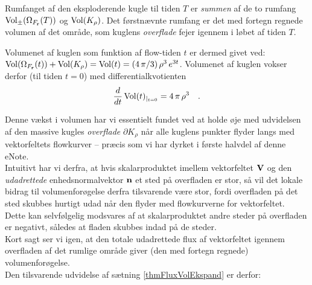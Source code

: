 \begin{aha}
Rumfanget af den eksploderende kugle til tiden $T$ er \emph{summen} af de to rumfang $\operatorname{Vol}_{\pm}(\Omega_{F_{\mathbf{r}}}(T))$ og $\operatorname{Vol}(K_{\rho})$. Det førstnævnte rumfang er det med fortegn regnede volumen af det område, som kuglens \emph{overflade} fejer igennem i løbet af tiden $T$.
\end{aha}

Volumenet af kuglen som funktion af
flow-tiden $t$ er dermed givet ved: $\operatorname{Vol}(\Omega_{F_{\mathbf{r}}}(t)) + \operatorname{Vol}(K_{\rho}) = \operatorname{Vol}(t) =
(4\,\pi/3)\,\rho^{3}\,e^{3t}$. Volumenet af
kuglen vokser derfor (til tiden $t=0$) med
differentialkvotienten
\begin{equation}
\frac{d}{dt}\operatorname{Vol}(t)_{|_{t=0}} =
4\,\pi\,\rho^{3} \quad .
\end{equation}

Denne vækst i volumen har vi essentielt fundet ved at holde øje med
udvidelsen af den massive kugles {\em{overflade}}
$\partial K_{\rho}$ når alle kuglens punkter
flyder langs med vektorfeltets flowkurver -- præcis som vi har dyrket i første halvdel af denne eNote.\\

Intuitivt har vi derfra, at hvis skalarproduktet imellem
vektorfeltet ${\bf{V}}$ og den \emph{udadrettede}
enhedsnormalvektor ${\bf{n}}$ et sted på
overfladen er stor, så vil det lokale bidrag til
volumenforøgelse derfra tilsvarende være stor, fordi
overfladen på det sted skubbes hurtigt udad når den flyder med flowkurverne for vektorfeltet.\\

Dette kan selvfølgelig modsvares af at
skalarproduktet andre steder på overfladen er
negativt, således at fladen skubbes ind\-ad på
de steder. \\

Kort sagt ser vi igen, at den totale
udadrettede flux af vektorfeltet igennem
overfladen af det rumlige område giver (den med fortegn regnede) volumenforøgelse.\\

Den tilsvarende udvidelse af sætning \ref{thmFluxVolEkspand} er derfor:


